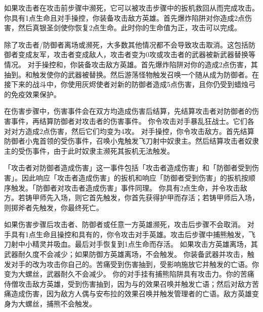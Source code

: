 如果攻击者在攻击前步骤中濒死，它可以被攻击步骤中的扳机救回从而完成攻击。
\example 你具有1点生命且对手操控，你装备攻击敌方英雄。首先爆炸陷阱对你造成2点伤害，然后真银圣剑使你恢复2点生命。此时你的生命值为正，攻击可以完成。

除了攻击者/防御者离场或濒死，大多数其他情况都不会导致攻击取消。这包括防御者变成友军，攻击者变成敌人，攻击者变为0攻或攻击者的武器被新武器替换等情况。
\example 对手操控和，你装备攻击敌方英雄。首先爆炸陷阱对你的造成2点伤害，其抽到。和触发使你的武器被替换。然后游荡怪物触发召唤一个随从成为防御者。在接下来的战斗中，你使用灰烬使者对新的防御者造成5点伤害，且你仍受到蜡烛弓的免疫效果保护。

在伤害步骤中，伤害事件会在双方均造成伤害后结算，先结算攻击者对防御者的伤害事件，再结算防御者对攻击者的伤害事件。
\example 你令攻击对手暴乱狂战士。它们各对对方造成2点伤害，然后它们均变为4攻。
\example 对手操控，你令攻击敌方。首先结算防御者小鬼首领的受伤事件，召唤小鬼触发飞刀射中奴隶主。然后结算攻击者奴隶主的受伤事件，由于此时奴隶主濒死其扳机无法触发。

\notice 「攻击者对防御者造成伤害」这一事件包括「攻击者造成伤害」和「防御者受到伤害」。因此响应「攻击者造成伤害」的扳机和响应「防御者受到伤害」的扳机按顺序触发。「防御者对攻击者造成伤害」事件同理。
\example 你具有2点生命，并令攻击敌方。若铸甲师先入场，则它首先触发，你首先获得护甲而存活；若铸甲师后入场，则掷斧者先触发，你最终死亡。

如果伤害步骤后攻击者、防御者或任意一方英雄濒死，攻击后步骤不会取消。
\example 对手具有1点生命且操控和具有的，你令攻击对手英雄。攻击后步骤中捕熊触发，飞刀射中小精灵并吸血。最后对手恢复到1点生命而存活。
\exception 如果攻击方英雄离场，其武器耐久度不会减少；如果防御方英雄离场，不会触发。
\example 你装备武器并攻击，触发对手的改为攻击你自己的。苦痛受到伤害抽到，受影响施放它并触发的亡语。你变为大螺丝，武器耐久不会减少。
\example 你的对手挂有捕熊陷阱具有攻击力。你的苦痛侍僧攻击敌方英雄，受到伤害抽到，因为与的效果召唤并触发亡语；然后对敌方苦痛造成伤害，因为敌方人偶与安布拉的效果召唤并触发管理者的亡语。敌方英雄变身为大螺丝，捕熊不会触发。

